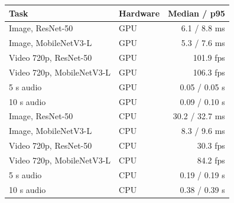 \begin{tabular}{llr}
\toprule
Task & Hardware & Median / p95 \\
\midrule
Image, ResNet-50 & GPU & 6.1 / 8.8 ms \\
Image, MobileNetV3-L & GPU & 5.3 / 7.6 ms \\
Video 720p, ResNet-50 & GPU & 101.9 fps \\
Video 720p, MobileNetV3-L & GPU & 106.3 fps \\
5 s audio & GPU & 0.05 / 0.05 s \\
10 s audio & GPU & 0.09 / 0.10 s \\
Image, ResNet-50 & CPU & 30.2 / 32.7 ms \\
Image, MobileNetV3-L & CPU & 8.3 / 9.6 ms \\
Video 720p, ResNet-50 & CPU & 30.3 fps \\
Video 720p, MobileNetV3-L & CPU & 84.2 fps \\
5 s audio & CPU & 0.19 / 0.19 s \\
10 s audio & CPU & 0.38 / 0.39 s \\
\bottomrule
\end{tabular}

